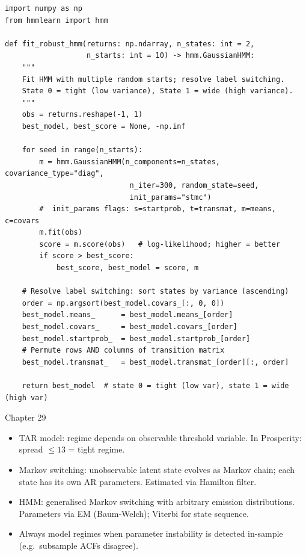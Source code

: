 \documentclass[12pt,a4paper,openany]{report}
\theoremstyle{definition}
\begin{document}
\begin{lstlisting}[caption={Post-processing: resolve label switching and multi-start EM}]
import numpy as np
from hmmlearn import hmm

def fit_robust_hmm(returns: np.ndarray, n_states: int = 2,
                   n_starts: int = 10) -> hmm.GaussianHMM:
    """
    Fit HMM with multiple random starts; resolve label switching.
    State 0 = tight (low variance), State 1 = wide (high variance).
    """
    obs = returns.reshape(-1, 1)
    best_model, best_score = None, -np.inf

    for seed in range(n_starts):
        m = hmm.GaussianHMM(n_components=n_states, covariance_type="diag",
                             n_iter=300, random_state=seed,
                             init_params="stmc")
        #  init_params flags: s=startprob, t=transmat, m=means, c=covars
        m.fit(obs)
        score = m.score(obs)   # log-likelihood; higher = better
        if score > best_score:
            best_score, best_model = score, m

    # Resolve label switching: sort states by variance (ascending)
    order = np.argsort(best_model.covars_[:, 0, 0])
    best_model.means_      = best_model.means_[order]
    best_model.covars_     = best_model.covars_[order]
    best_model.startprob_  = best_model.startprob_[order]
    # Permute rows AND columns of transition matrix
    best_model.transmat_   = best_model.transmat_[order][:, order]

    return best_model  # state 0 = tight (low var), state 1 = wide (high var)
\end{lstlisting}

\begin{takeawaybox}{Chapter 29}
\begin{itemize}
  \item TAR model: regime depends on observable threshold variable. In Prosperity: spread $\leq 13$ = tight regime.
  \item Markov switching: unobservable latent state evolves as Markov chain; each state has its own AR parameters. Estimated via Hamilton filter.
  \item HMM: generalised Markov switching with arbitrary emission distributions. Parameters via EM (Baum-Welch); Viterbi for state sequence.
  \item Always model regimes when parameter instability is detected in-sample (e.g.\ subsample ACFs disagree).
\end{itemize}
\end{takeawaybox}
\end{document}
